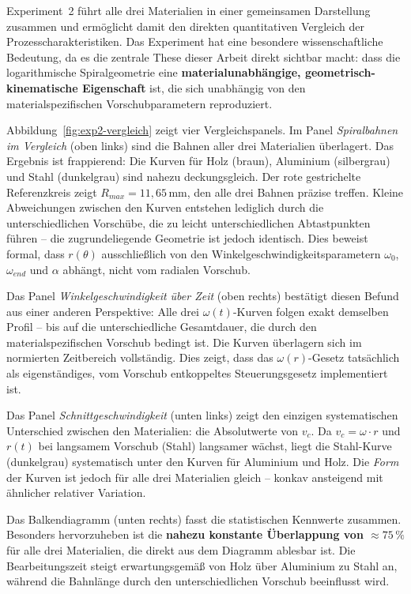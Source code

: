 ﻿\documentclass[12pt,a4paper]{article}
\begin{document}
Experiment~2 führt alle drei Materialien in einer gemeinsamen Darstellung zusammen und ermöglicht damit den direkten quantitativen Vergleich der Prozesscharakteristiken. Das Experiment hat eine besondere wissenschaftliche Bedeutung, da es die zentrale These dieser Arbeit direkt sichtbar macht: dass die logarithmische Spiralgeometrie eine \textbf{materialunabhängige, geometrisch-kinematische Eigenschaft} ist, die sich unabhängig von den materialspezifischen Vorschubparametern reproduziert.

Abbildung~\ref{fig:exp2-vergleich} zeigt vier Vergleichspanels. Im Panel \textit{Spiralbahnen im Vergleich} (oben links) sind die Bahnen aller drei Materialien überlagert. Das Ergebnis ist frappierend: Die Kurven für Holz (braun), Aluminium (silbergrau) und Stahl (dunkelgrau) sind nahezu deckungsgleich. Der rote gestrichelte Referenzkreis zeigt $R_{max} = 11{,}65\,\text{mm}$, den alle drei Bahnen präzise treffen. Kleine Abweichungen zwischen den Kurven entstehen lediglich durch die unterschiedlichen Vorschübe, die zu leicht unterschiedlichen Abtastpunkten führen -- die zugrundeliegende Geometrie ist jedoch identisch. Dies beweist formal, dass $r(\theta)$ ausschließlich von den Winkelgeschwindigkeitsparametern $\omega_0$, $\omega_{end}$ und $\alpha$ abhängt, nicht vom radialen Vorschub.

Das Panel \textit{Winkelgeschwindigkeit über Zeit} (oben rechts) bestätigt diesen Befund aus einer anderen Perspektive: Alle drei $\omega(t)$-Kurven folgen exakt demselben Profil -- bis auf die unterschiedliche Gesamtdauer, die durch den materialspezifischen Vorschub bedingt ist. Die Kurven überlagern sich im normierten Zeitbereich vollständig. Dies zeigt, dass das $\omega(r)$-Gesetz tatsächlich als eigenständiges, vom Vorschub entkoppeltes Steuerungsgesetz implementiert ist.

Das Panel \textit{Schnittgeschwindigkeit} (unten links) zeigt den einzigen systematischen Unterschied zwischen den Materialien: die Absolutwerte von $v_c$. Da $v_c = \omega \cdot r$ und $r(t)$ bei langsamem Vorschub (Stahl) langsamer wächst, liegt die Stahl-Kurve (dunkelgrau) systematisch unter den Kurven für Aluminium und Holz. Die \textit{Form} der Kurven ist jedoch für alle drei Materialien gleich -- konkav ansteigend mit ähnlicher relativer Variation.

Das Balkendiagramm (unten rechts) fasst die statistischen Kennwerte zusammen. Besonders hervorzuheben ist die \textbf{nahezu konstante Überlappung von $\approx 75\,\%$} für alle drei Materialien, die direkt aus dem Diagramm ablesbar ist. Die Bearbeitungszeit steigt erwartungsgemäß von Holz über Aluminium zu Stahl an, während die Bahnlänge durch den unterschiedlichen Vorschub beeinflusst wird.
\end{document}
